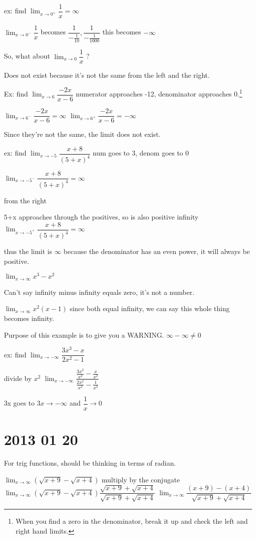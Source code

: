 \documentclass[12pt]{article}
\begin{document}
ex: find $\lim_{x\to 0^+}\dfrac{1}{x} = \infty$

$\lim_{x\to 0^-}\dfrac{1}{x}$ becomes $\dfrac{1}{-\frac{1}{10}},\dfrac{1}{-\frac{1}{1000}}$ this becomes
$-\infty$

So, what about $\lim_{x\to 0}\dfrac{1}{x}$ ?

Does not exist because it's not the same from the left and the right.

Ex: find $\lim_{x\to 6}\dfrac{-2x}{x-6}$ numerator approaches -12, denominator approaches 0.\footnote{When you
  find a zero in the denominator, break it up and check the left and right hand limits.}

$\lim_{x\to 6^-}\dfrac{-2x}{x-6} = \infty$
$\lim_{x\to 6^+}\dfrac{-2x}{x-6} = -\infty$

Since they're not the same, the limit does not exist.


ex: find $\lim_{x \to -5}\dfrac{x+8}{(5+x)^4}$ num goes to 3, denom goes to 0

$\lim_{x \to -5^-}\dfrac{x+8}{(5+x)^4} = \infty$

from the right

5+x approaches through the positives, so is also positive infinity
$\lim_{x \to -5^+}\dfrac{x+8}{(5+x)^4} = \infty$

thus the limit is $\infty$
because the denominator has an even power, it will always be positive.

$\lim_{x\to\infty}x^3-x^2$

Can't say infinity minus infinity equals zero, it's not a number.

$\lim_{x\to\infty}x^2(x-1)$ since both equal infinity, we can say this whole thing becomes infinity. 

Purpose of this example is to give you a WARNING. $\infty - \infty \neq 0$

ex: find $\lim_{x\to - \infty}\dfrac{3x^3-x}{2x^2-1}$

divide by $x^2$
$\lim_{x\to - \infty}\dfrac{\frac{3x^3}{x^2}-\frac{x}{x^2}}{\frac{2x^2}{x^2}-\frac{1}{x^2}}$

3x goes to $3x \to -\infty$ and $\dfrac{1}{x} \to 0$

\section{2013 01 20 }
For trig functions, should be thinking in terms of radian.

$\lim_{x\to\infty}(\sqrt{x+9} - \sqrt{x+4})$
multiply by the conjugate
$\lim_{x\to\infty}(\sqrt{x+9} - \sqrt{x+4})\dfrac{\sqrt{x+9} + \sqrt{x+4}}{\sqrt{x+9} + \sqrt{x+4}}$
$\lim_{x\to\infty}\dfrac{(x+9) - (x+4)}{\sqrt{x+9} + \sqrt{x+4}}$
\end{document}
